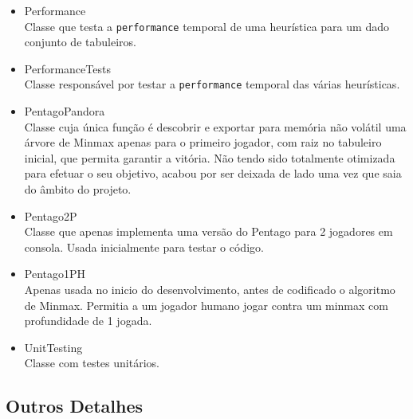 \begin{itemize}
\item Performance \\
Classe que testa a \verb|performance| temporal de uma heurística para um dado conjunto de tabuleiros.

\item PerformanceTests \\
Classe responsável por testar a \verb|performance| temporal das várias heurísticas. 

\item PentagoPandora \\
\label{PandoraDescricao}
Classe cuja única função é descobrir e exportar para memória não volátil uma árvore de Minmax apenas para o primeiro jogador, com raiz no tabuleiro inicial, que permita garantir a vitória. Não tendo sido totalmente otimizada para efetuar o seu objetivo, acabou por ser deixada de lado uma vez que saia do âmbito do projeto.

\item Pentago2P \\
Classe que apenas implementa uma versão do Pentago para 2 jogadores em consola. Usada inicialmente para testar o código.

\item Pentago1PH \\
Apenas usada no inicio do desenvolvimento, antes de codificado o algoritmo de Minmax. Permitia a um jogador humano jogar contra um minmax com profundidade de 1 jogada.

\item UnitTesting \\
Classe com testes unitários. 

\end{itemize}

\subsection{Outros Detalhes}
